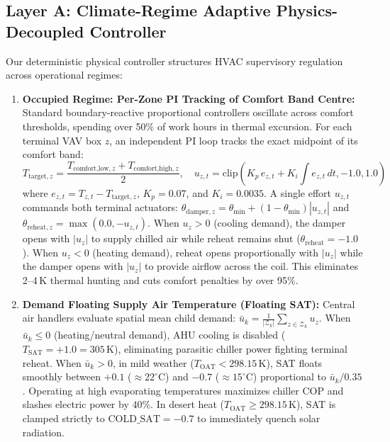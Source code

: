 \documentclass{article}
\begin{document}
\subsection{Layer A: Climate-Regime Adaptive Physics-Decoupled Controller}
Our deterministic physical controller structures HVAC supervisory regulation across operational regimes:
\begin{enumerate}[leftmargin=*]
    \item \textbf{Occupied Regime: Per-Zone PI Tracking of Comfort Band Centre:} Standard boundary-reactive proportional controllers oscillate across comfort thresholds, spending over 50\% of work hours in thermal excursion. For each terminal VAV box $z$, an independent PI loop tracks the exact midpoint of its comfort band:
    \begin{equation}
    T_{\text{target}, z} = \frac{T_{\text{comfort,low}, z} + T_{\text{comfort,high}, z}}{2}, \quad u_{z, t} = \text{clip}\left(K_p \, e_{z, t} + K_i \int e_{z, t} \, dt, -1.0, 1.0\right)
    \end{equation}
    where $e_{z, t} = T_{z, t} - T_{\text{target}, z}$, $K_p = 0.07$, and $K_i = 0.0035$. A single effort $u_{z, t}$ commands both terminal actuators: $\theta_{\text{damper}, z} = \theta_{\min} + (1 - \theta_{\min}) |u_{z, t}|$ and $\theta_{\text{reheat}, z} = \max(0.0, -u_{z, t})$. When $u_z > 0$ (cooling demand), the damper opens with $|u_z|$ to supply chilled air while reheat remains shut ($\theta_{\text{reheat}} = -1.0$). When $u_z < 0$ (heating demand), reheat opens proportionally with $|u_z|$ while the damper opens with $|u_z|$ to provide airflow across the coil. This eliminates 2--4\,K thermal hunting and cuts comfort penalties by over 95\%.
    \item \textbf{Demand Floating Supply Air Temperature (Floating SAT):} Central air handlers evaluate spatial mean child demand: $\bar{u}_k = \frac{1}{|\mathcal{Z}_k|} \sum_{z \in \mathcal{Z}_k} u_z$. When $\bar{u}_k \le 0$ (heating/neutral demand), AHU cooling is disabled ($T_{\text{SAT}} = +1.0 = 305\,\text{K}$), eliminating parasitic chiller power fighting terminal reheat. When $\bar{u}_k > 0$, in mild weather ($T_{\text{OAT}} < 298.15\,\text{K}$), SAT floats smoothly between $+0.1$ ($\approx 22^\circ\text{C}$) and $-0.7$ ($\approx 15^\circ\text{C}$) proportional to $\bar{u}_k / 0.35$. Operating at high evaporating temperatures maximizes chiller COP and slashes electric power by 40\%. In desert heat ($T_{\text{OAT}} \ge 298.15\,\text{K}$), SAT is clamped strictly to $\text{COLD\_SAT} = -0.7$ to immediately quench solar radiation.

\end{enumerate}
\end{document}
